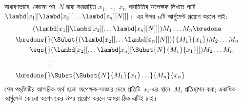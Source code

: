 \documentclass[../../../include/open-logic-section]{subfiles}
\begin{document}
সাধারণভাবে, কোনো পদ~$N$ দ্বারা সংজ্ঞায়িত $x_1$, \dots,~$x_n$ পরামিতির
অপেক্ষক লিখতে পারি
$\lambd[x_1][\lambd[x_2][\ldots\lambd[x_n][N]]]$। এর উপর $n$টি আর্গুমেন্ট
প্রয়োগ করলে পাই:
\begin{multline*}
  (\lambd[x_1][\lambd[x_2][\ldots\lambd[x_n][N]]]) M_1 \dots M_n \bredone\\
  \begin{aligned}
  \bredone {} & (\Subst{(\lambd[x_2][\ldots\lambd[x_n][N]])}{M_1}{x_1}) M_2
  \dots M_n\\
   \eqs {} & (\lambd[x_2][\ldots\lambd[x_n][\Subst{N}{M_1}{x_1}]]) M_2
            \dots M_n \\
  \vdots & \\
  \bredone {} &\Subst{\Subst{N}{M_1}{x_1}\ldots}{M_n}{x_n}
  \end{aligned}
\end{multline*}
শেষ পঙ্‌ক্তিটির আক্ষরিক অর্থ হলো অপেক্ষক-সংজ্ঞার দেহে প্রতিটি~$x_i$-এর
স্থানে~$M_i$ প্রতিস্থাপন করা; একাধিক আর্গুমেন্ট কোনো অপেক্ষকের উপর প্রয়োগ
করলে আমরা ঠিক এটিই চাই।
\end{document}
